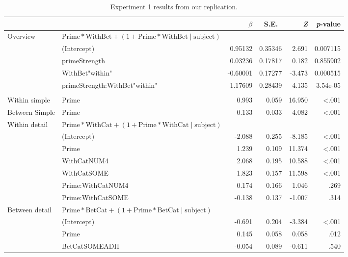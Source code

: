\documentclass[10pt]{article}
\begin{document}
\begin{multicols}{2}
\begin{table}[ht]
  \caption{Experiment 1 results from our replication.}\vspace{-20pt}
  \begin{center}
    \begin{tabular}{llrrrr}
      \hline
      & & \(\beta\) & S.E.\ & \emph{Z} & \emph{p}-value  \\
      \hline
      Overview & \(\text{Prime} * \text{WithBet} + (1 + \text{Prime} * \text{WithBet} \mid \text{subject})\) & & & \\
 &       (Intercept)   &                 0.95132 &   0.35346 &   2.691 &0.007115 \\
 &  primeStrength     &             0.03236 &   0.17817 &   0.182 &0.855902 \\
 &  WithBet"within"    &           -0.60001 &   0.17277 &  -3.473 &0.000515 \\
      & primeStrength:WithBet"within" &  1.17609 &    0.28439 &   4.135 & 3.54e-05 \\
      & & & & & \\
      Within simple & Prime & 0.993 & 0.059 & 16.950 & <.001 \\
      Between Simple & Prime & 0.133 & 0.033 & 4.082 & <.001 \\
      Within detail & \multicolumn{2}{l}{\(\text{Prime} * \text{WithCat} + (1 + \text{Prime} * \text{WithCat} \mid \text{subject})\)}  & & & \\
      & (Intercept)  & -2.088 & 0.255 & -8.185 & <.001\\
      & Prime & 1.239 & 0.109 & 11.374 & <.001 \\
      & WithCatNUM4 & 2.068 & 0.195 & 10.588 & <.001 \\
      & WithCatSOME & 1.823 & 0.157 & 11.598 & <.001 \\
      & Prime:WithCatNUM4 & 0.174 & 0.166 & 1.046 & .269 \\
      & Prime:WithCatSOME & -0.138 & 0.137 & -1.007 & .314 \\
      Between detail & \multicolumn{2}{l}{\(\text{Prime} * \text{BetCat} + (1 + \text{Prime} * \text{BetCat} \mid \text{subject})\)}  & & & \\
      & (Intercept)  & -0.691 & 0.204 & -3.384 & <.001\\
      & Prime & 0.145 & 0.058 & 0.058 & .012 \\
      & BetCatSOMEADH & -0.054 & 0.089 & -0.611 & .540 \\

\end{tabular}
\end{center}
\end{table}
\end{multicols}
\end{document}
